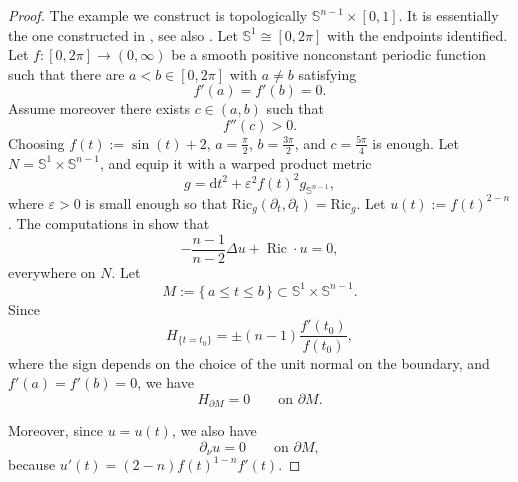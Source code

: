 \documentclass[12pt,a4paper,reqno]{amsart}
\theoremstyle{definition}
\renewcommand{\leq}{\leqslant}
\DeclareMathOperator{\Ric}{Ric}
\begin{document}
{\begin{proof}
The example we construct is topologically $\mathbb S^{n-1}\times [0,1]$. It is essentially the one constructed in \cite[Remark 4]{AX24}, see also \cite{BourCarron}. Let $\mathbb S^1\cong [0,2\pi]$ with the endpoints identified. Let \(f:[0,2\pi]\to (0,\infty)\) be a smooth positive nonconstant periodic function such that there are \(a<b\in [0,2\pi]\) with \(a\neq b\) satisfying
\[
f'(a)=f'(b)=0.
\] 
Assume moreover there exists $c\in (a,b)$ such that 
\begin{equation}\label{eqn:RicciViolated}
f''(c)>0.
\end{equation}
Choosing $f(t):=\sin(t)+2$, $a=\frac{\pi}{2}$, $b=\frac{3\pi}{2}$, and $c=\frac{5\pi}{4}$ is enough. Let \(N=\mathbb S^1\times \mathbb S^{n-1}\), and equip it with a warped product metric
\[
g=\mathrm{d}t^2+\varepsilon^2 f(t)^2g_{\mathbb S^{n-1}},
\]
where $\varepsilon>0$ is small enough so that $\mathrm{Ric}_g(\partial_t,\partial_t)=\mathrm{Ric}_g$. Let $
u(t):=f(t)^{2-n}$. 
The computations in \cite[Remark 4]{AX24} show that
\begin{equation}\label{eqn:SpectralRicciVerified}
-\frac{n-1}{n-2}\Delta u+\Ric\cdot u = 0,
\end{equation}
everywhere on $N$. Let
\[
M:=\{\,a\leq t\leq b\,\}\subset \mathbb S^1\times \mathbb S^{n-1}.
\]
Since
\[
H_{\{t=t_0\}}=\pm (n-1)\frac{f'(t_0)}{f(t_0)},
\]
where the sign depends on the choice of the unit normal on the boundary, and \(f'(a)=f'(b)=0\), we have
\[
H_{\partial M}=0
\qquad\text{on }\partial M.
\]

Moreover, since \(u=u(t)\), we also have
\begin{equation}\label{eqn:partialnu}
\partial_\nu u=0
\qquad\text{on }\partial M,
\end{equation}
because \(u'(t)=(2-n)f(t)^{1-n}f'(t)\).


\end{proof}}
\end{document}
